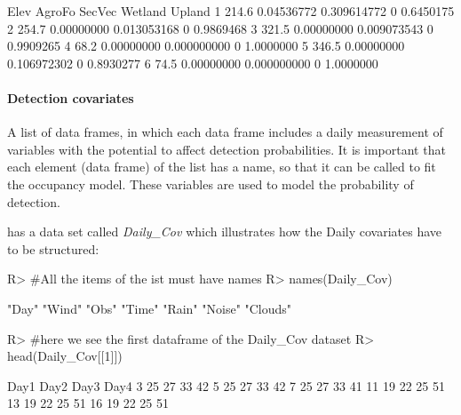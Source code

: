 \documentclass[article]{jss}
\begin{document}
\begin{CodeChunk}

\begin{CodeOutput}
   Elev     AgroFo      SecVec Wetland    Upland
1 214.6 0.04536772 0.309614772       0 0.6450175
2 254.7 0.00000000 0.013053168       0 0.9869468
3 321.5 0.00000000 0.009073543       0 0.9909265
4  68.2 0.00000000 0.000000000       0 1.0000000
5 346.5 0.00000000 0.106972302       0 0.8930277
6  74.5 0.00000000 0.000000000       0 1.0000000
\end{CodeOutput}
\end{CodeChunk}

\paragraph{Detection covariates}\label{detection-covariates}

A list of data frames, in which each data frame includes a daily
measurement of variables with the potential to affect detection
probabilities. It is important that each element (data frame) of the
list has a name, so that it can be called to fit the occupancy model.
These variables are used to model the probability of detection.

 has a data set called \emph{Daily\_Cov} which
illustrates how the Daily covariates have to be structured:

\begin{CodeChunk}

\begin{CodeInput}
R> #All the items of the ist must have names
R> names(Daily_Cov)
\end{CodeInput}

\begin{CodeOutput}
[1] "Day"    "Wind"   "Obs"    "Time"   "Rain"   "Noise"  "Clouds"
\end{CodeOutput}

\begin{CodeInput}
R> #here we see the first dataframe of the Daily_Cov dataset
R> head(Daily_Cov[[1]])
\end{CodeInput}

\begin{CodeOutput}
   Day1 Day2 Day3 Day4
3    25   27   33   42
5    25   27   33   42
7    25   27   33   41
11   19   22   25   51
13   19   22   25   51
16   19   22   25   51
\end{CodeOutput}
\end{CodeChunk}
\end{document}
